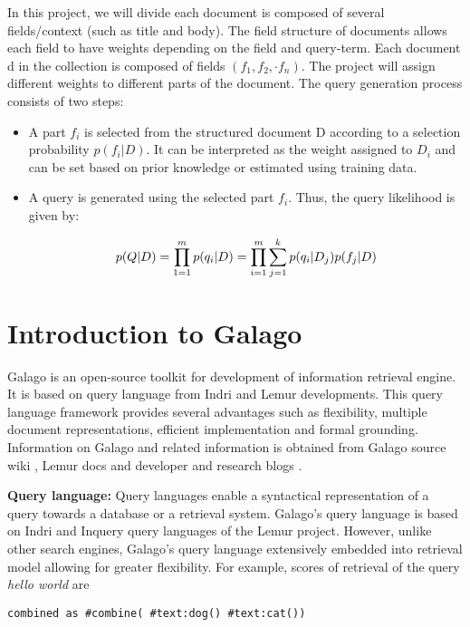 \documentclass[draftcls, onecolumn, 11pt]{IEEEtran}
\begin{document}
In this project, we will divide each document is composed of several fields/context (such as title and body). The field structure of documents allows each field to have weights depending on the field and query-term. Each document d in the collection is composed of fields $(f_1, f_2, \cdot f_n)$. The project will assign different weights to different parts of the document. The query generation process consists of two steps:
\begin{itemize}
\item A part $f_i$ is selected from the structured document D according to a selection probability $p(f_i|D)$. It can be interpreted as the weight assigned to $D_i$ and can be set based on prior knowledge or estimated using training data.
\item A query is generated using the selected part $f_i$. Thus, the query likelihood is given by:

\begin{equation}
   p(Q|D)=\prod_{1=1}^{m} p(q_i|D)\\
   = \prod_{i=1}^m \sum_{j=1}^k p(q_i|D_j)p(f_j|D)
\end{equation}

\end{itemize}

\section{Introduction to Galago}

Galago is an open-source toolkit for development of information retrieval engine. It is based on query language from Indri and Lemur developments. This query language framework provides several advantages such as flexibility, multiple document representations, efficient implementation and formal grounding. Information on Galago and related information is obtained from Galago source wiki \cite{Site3}, Lemur docs \cite{Site2} and developer and research blogs \cite{Site1}.

\textbf{Query language:}
Query languages enable a syntactical representation of a query towards a database or a retrieval system. Galago's query language is based on Indri and Inquery query languages of the Lemur project. However, unlike other search engines, Galago's query language extensively embedded into retrieval model allowing for greater flexibility. For example, scores of retrieval of the query \emph{hello world} are

\begin{lstlisting}
combined as #combine( #text:dog() #text:cat())
\end{lstlisting}
\end{document}
